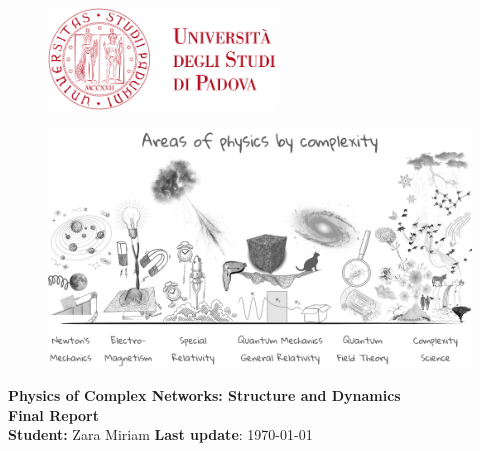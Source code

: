 \begin{center}

\vspace*{1cm}

\begin{figure}
  \raggedleft
  \begin{minipage}{4cm}
  \includegraphics[width=6cm]{images/logo.png}
  \end{minipage}
\end{figure}

\begin{figure}[H]
    \centering
    \includegraphics[width=\textwidth]{images/areas_of_physics.png} 
\end{figure}
\vspace*{1cm}
\textcolor{unipd}{\textbf{\large Physics of Complex Networks: Structure and Dynamics}} \\
\vspace*{1cm}
\textcolor{unipd}{\textbf{\huge Final Report}} \\
\vspace*{2cm}
\textbf{Student:} Zara Miriam \hfill \textbf{Last update}: \today\\
\end{center}



\thispagestyle{empty} %
\clearpage\setcounter{page}{1} %
